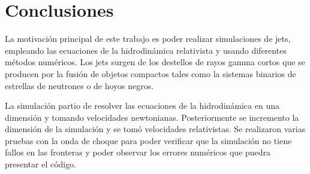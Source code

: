 \documentclass[12pt,a4paper]{book}
\begin{document}
\chapter{Conclusiones}

La motivación principal de este trabajo es poder realizar simulaciones de jets, empleando las ecuaciones de la hidrodinámica relativista y usando diferentes métodos numéricos. Los jets surgen de los destellos de rayos gamma cortos que se producen por la fusión de objetos compactos tales como la sistemas binarios de estrellas de neutrones o de hoyos negros. 

La simulación partio de resolver las ecuaciones de la hidrodinámica en una dimensión y tomando velocidades newtonianas. Posteriormente se incremento la dimensión de la simulación y se tomó velocidades relativistas. Se realizaron varias pruebas con la onda de choque para poder verificar que la simulación no tiene fallos en las fronteras y poder observar los errores numéricos que puedra presentar el código.
\end{document}
